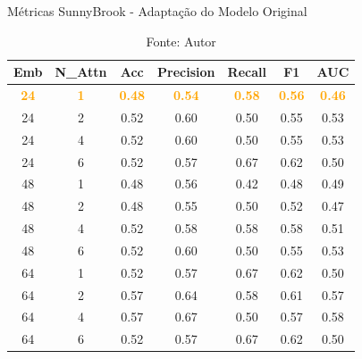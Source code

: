 \begin{table}[htbp]
\centering
\caption{Métricas SunnyBrook - Adaptação do Modelo Original}
\begin{tabular}{ccccccc}
\toprule
\textbf{Emb} & \textbf{N\_Attn} & \textbf{Acc} & \textbf{Precision} & \textbf{Recall} & \textbf{F1} & \textbf{AUC} \\
\midrule
\textcolor{orange}{\textbf{24}} & \textcolor{orange}{\textbf{1}} & \textcolor{orange}{\textbf{0.48}} & \textcolor{orange}{\textbf{0.54}} & \textcolor{orange}{\textbf{0.58}} & \textcolor{orange}{\textbf{0.56}} & \textcolor{orange}{\textbf{0.46}} \\
24 & 2 & 0.52 & 0.60 & 0.50 & 0.55 & 0.53 \\
24 & 4 & 0.52 & 0.60 & 0.50 & 0.55 & 0.53 \\
24 & 6 & 0.52 & 0.57 & 0.67 & 0.62 & 0.50 \\
48 & 1 & 0.48 & 0.56 & 0.42 & 0.48 & 0.49 \\
48 & 2 & 0.48 & 0.55 & 0.50 & 0.52 & 0.47 \\
48 & 4 & 0.52 & 0.58 & 0.58 & 0.58 & 0.51 \\
48 & 6 & 0.52 & 0.60 & 0.50 & 0.55 & 0.53 \\
64 & 1 & 0.52 & 0.57 & 0.67 & 0.62 & 0.50 \\
64 & 2 & 0.57 & 0.64 & 0.58 & 0.61 & 0.57 \\
64 & 4 & 0.57 & 0.67 & 0.50 & 0.57 & 0.58 \\
64 & 6 & 0.52 & 0.57 & 0.67 & 0.62 & 0.50 \\
\bottomrule
\end{tabular}
\caption*{Fonte: Autor}
\label{tab:metrics_sunny_orig}
\end{table}




